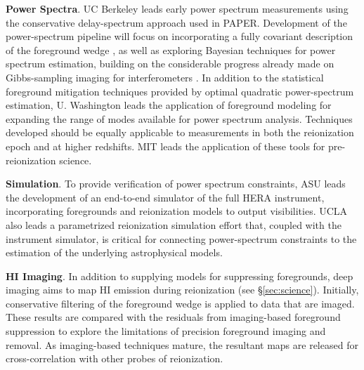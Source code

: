 \documentclass[ars]{copernicus}
\begin{document}
{\bf Power Spectra}. UC Berkeley leads early power spectrum measurements using the conservative
delay-spectrum approach used in PAPER.  %
Development of
the power-spectrum pipeline will focus on incorporating
a fully covariant description of the foreground wedge
\citep{liu_tegmark2011,dillon_et_al2013a}, as well as
exploring Bayesian techniques for power spectrum estimation, building on the considerable
progress already made on Gibbs-sampling imaging for interferometers \citep{sutter_et_al2014}.
In addition to the statistical foreground mitigation techniques provided by optimal quadratic
power-spectrum estimation, U. Washington leads the application of 
foreground modeling for expanding the range of modes available for power spectrum analysis.
Techniques developed should be equally applicable
to measurements in both the reionization epoch and at higher redshifts.  MIT leads the application
of these tools for pre-reionization science.

{\bf Simulation}. To provide verification of power spectrum constraints, ASU leads the
development of an end-to-end simulator of the full HERA instrument, incorporating
foregrounds and reionization models to output visibilities.  UCLA also leads
a parametrized reionization simulation effort that, coupled with the instrument
simulator, is critical for connecting power-spectrum constraints to the estimation
of the underlying astrophysical models.


{\bf HI Imaging}. In addition to supplying models for suppressing foregrounds,
deep imaging aims to map HI emission during reionization (see \S\ref{sec:science}).
Initially, conservative filtering of the foreground wedge is applied to data that
are imaged.  These results are compared with the residuals from imaging-based
foreground suppression to explore the limitations of 
precision foreground imaging and removal.  As imaging-based techniques mature, the resultant
maps are released for cross-correlation with other probes of reionization.

%
\end{document}
